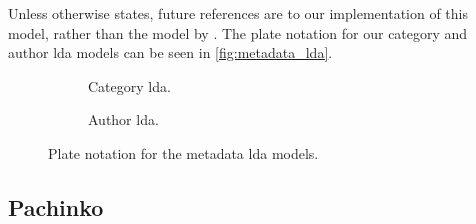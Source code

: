 Unless otherwise states, future references are to our implementation of this model, rather than the model by \citet{author_topic_2012}.
The plate notation for our category and author \gls{lda} models can be seen in \autoref{fig:metadata_lda}.

\begin{figure*}[ht]
	\centering
	\begin{subfigure}{0.3\textwidth}
		\centering
		
		\caption{Category \gls{lda}.}
		\label{fig:category_lda}
	\end{subfigure}
	\hspace{5em}
	\begin{subfigure}{0.3\textwidth}
		\centering
		
		\caption{Author \gls{lda}.}
		\label{fig:author_lda}
	\end{subfigure}
	\caption{Plate notation for the metadata \gls{lda} models.}
	\label{fig:metadata_lda}
\end{figure*}

\subsection{Pachinko}


